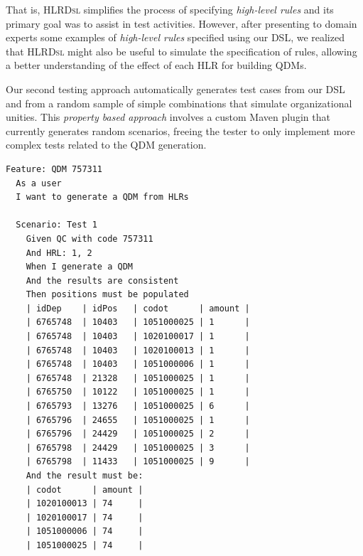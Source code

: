 \documentclass[AMA,STIX1COL,hidelinks]{WileyNJD-v2}
\newcommand{\callers}{\emph{high-level rules}\xspace}
\newcommand{\shc}{HLR\xspace}
\newcommand{\hlrdsl}{\textsc{HLRDsl}\xspace}
\begin{document}
That is, \hlrdsl simplifies the process of specifying \callers and its primary goal was to assist in
test activities. However, after presenting to domain experts some examples of \callers specified using our DSL,
we realized that \hlrdsl might also be useful to simulate the specification of rules,
allowing a better understanding of the effect of each \shc for building QDMs.


Our second testing approach automatically generates test cases from our DSL and from a random sample of simple combinations that simulate organizational unities. This \emph{property based approach} involves a custom Maven plugin that currently generates random scenarios, freeing the tester to only implement more complex tests related to the QDM generation. 

\begin{lstlisting}[frame=single, language=Cucumber, caption={\it Cucumber feature}, label={code:cucumber}]
Feature: QDM 757311
  As a user
  I want to generate a QDM from HLRs

  Scenario: Test 1
    Given QC with code 757311
    And HRL: 1, 2
    When I generate a QDM
    And the results are consistent
    Then positions must be populated
    | idDep    | idPos   | codot      | amount |
    | 6765748  | 10403   | 1051000025 | 1      |
    | 6765748  | 10403   | 1020100017 | 1      |
    | 6765748  | 10403   | 1020100013 | 1      |
    | 6765748  | 10403   | 1051000006 | 1      |
    | 6765748  | 21328   | 1051000025 | 1      |
    | 6765750  | 10122   | 1051000025 | 1      |    
    | 6765793  | 13276   | 1051000025 | 6      |
    | 6765796  | 24655   | 1051000025 | 1      |
    | 6765796  | 24429   | 1051000025 | 2      |
    | 6765798  | 24429   | 1051000025 | 3      |
    | 6765798  | 11433   | 1051000025 | 9      |   
    And the result must be:
    | codot      | amount |
    | 1020100013 | 74     |
    | 1020100017 | 74     |
    | 1051000006 | 74     |
    | 1051000025 | 74     |
\end{lstlisting}



\end{document}
